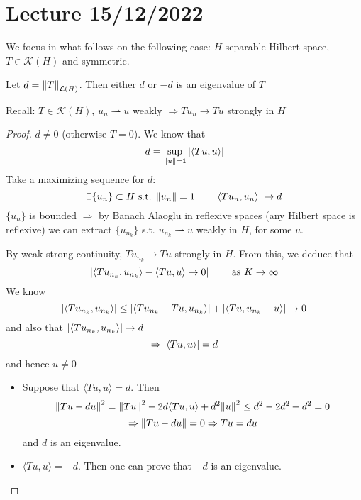 \section{Lecture 15/12/2022}

We focus in what follows on the following case: \(H\) separable Hilbert space, \(T \in \mathcal{K}(H)\) and symmetric.

\begin{proposition}
    Let \(d = \norm{T}_{\mathcal{L}(H)}\). Then either \(d\) or \(-d\) is an eigenvalue of \(T\)
\end{proposition}
Recall: \(T \in \mathcal{K}(H)\), \(u_n \rightharpoonup u\) weakly \(\Rightarrow T u_n \to Tu\) strongly in \(H\)

\begin{proof}
    \(d \neq 0\) (otherwise \(T=0\)). We know that
    \[
        d = \sup_{\norm{u}=1} \abs{\langle Tu, u\rangle}
    \]
    Take a maximizing sequence for \(d\):
    \[
        \exists \{u_n\} \subset H \text{ s.t. } \norm{u_n}=1 \qquad \abs{\langle Tu_n, u_n\rangle} \to d    
    \]
    \(\{u_n\}\) is bounded \(\Rightarrow\) by Banach Alaoglu in reflexive spaces (any Hilbert space is reflexive) we can extract \(\{u_{n_k}\}\) s.t. \(u_{n_k} \rightharpoonup u\) weakly in \(H\), for some \(u\).

    By weak strong continuity, \(T u_{n_k} \to Tu\) strongly in \(H\). From this, we deduce that 
    \[
        \abs{ \langle T u_{n_k}, u_{n_k}\rangle - \langle Tu, u\rangle \to 0} \qquad \text{ as } K \to \infty    
    \]
    We know
    \[
        \abs{ \langle Tu_{n_k}, u_{n_k}\rangle} \leq \abs{\langle T u_{n_k} - Tu, u_{n_k}\rangle} + \abs{ \langle Tu, u_{n_k} - u\rangle} \to 0
    \]
    and also that \(\abs{\langle T u_{n_k}, u_{n_k}\rangle} \to d\)
    \[
        \Rightarrow \abs{\langle Tu, u\rangle} = d
    \]
    and hence \(u \neq 0\)

    \begin{itemize}
        \item Suppose that \(\langle Tu, u\rangle = d\). Then
        \[
            \norm{Tu- du}^2 = \norm{Tu}^2 - 2d \langle Tu, u\rangle + d^2 \norm{u}^2 \leq d^2 - 2d^2 + d^2 = 0
        \]
        \[
            \Rightarrow \norm{Tu - du} = 0 \Rightarrow Tu = du
        \]
        and \(d\) is an eigenvalue.
        \item \(\langle Tu, u\rangle = -d\). Then one can prove that \(-d\) is an eigenvalue.
    \end{itemize}
\end{proof}

